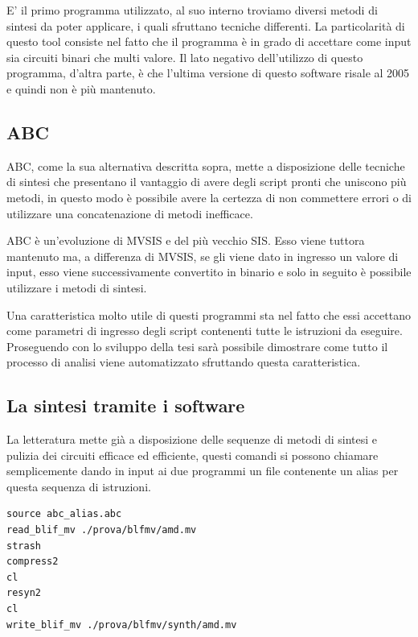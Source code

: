 \documentclass[]{book}
\begin{document}
E' il primo programma utilizzato, al suo interno troviamo diversi metodi di sintesi da poter applicare, i quali sfruttano tecniche differenti. La particolarità di questo tool consiste nel fatto che il programma è in grado di accettare come input sia circuiti binari che multi valore. Il lato negativo dell'utilizzo di questo programma, d'altra parte, è che l'ultima versione di questo software risale al 2005 e quindi non è più mantenuto.

\hypertarget{abc-1}{%
\subsection{ABC}\label{abc-1}}

ABC, come la sua alternativa descritta sopra, mette a disposizione delle tecniche di sintesi che presentano il vantaggio di avere degli script pronti che uniscono più metodi, in questo modo è possibile avere la certezza di non commettere errori o di utilizzare una concatenazione di metodi inefficace.

ABC è un'evoluzione di MVSIS e del più vecchio SIS. Esso viene tuttora mantenuto ma, a differenza di MVSIS, se gli viene dato in ingresso un valore di input, esso viene successivamente convertito in binario e solo in seguito è possibile utilizzare i metodi di sintesi.

Una caratteristica molto utile di questi programmi sta nel fatto che essi accettano come parametri di ingresso degli script contenenti tutte le istruzioni da eseguire. Proseguendo con lo sviluppo della tesi sarà possibile dimostrare come tutto il processo di analisi viene automatizzato sfruttando questa caratteristica.

\newpage

\hypertarget{la-sintesi-tramite-i-software}{%
\subsection{La sintesi tramite i software}\label{la-sintesi-tramite-i-software}}

La letteratura mette già a disposizione delle sequenze di metodi di sintesi e pulizia dei circuiti efficace ed efficiente, questi comandi si possono chiamare semplicemente dando in input ai due programmi un file contenente un alias per questa sequenza di istruzioni.

\begin{verbatim}
source abc_alias.abc
read_blif_mv ./prova/blfmv/amd.mv
strash
compress2
cl
resyn2
cl
write_blif_mv ./prova/blfmv/synth/amd.mv
\end{verbatim}
\end{document}

